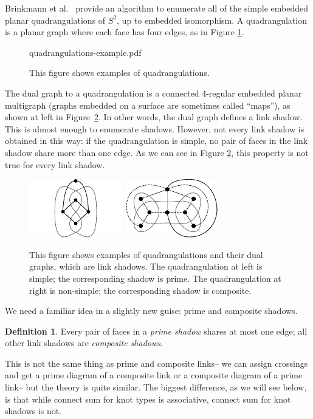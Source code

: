 \documentclass[amsmath,secnumarabic,amssymb,floatfix,nofootinbib,nobibnotes,letterpaper,11pt,tightenlines,showkeys]{revtex4}
\theoremstyle{definition}
\newtheorem{definition}[theorem]{Definition}
\let\mgp=\marginpar \marginparwidth18mm \marginparsep1mm
\def\marginpar#1{\mgp{\raggedright\tiny #1}}
\let\lbl=\label
\def\label#1{\lbl{#1}\ifinner\else\marginpar{\ref{#1} #1}\ignorespaces\fi}
\begin{document}
Brinkmann et al.~\cite{Brinkmann:2007up} provide an algorithm to enumerate all of the simple embedded planar quadrangulations of $S^2$, up to embedded isomorphism. A quadrangulation is a planar graph where each face has four edges, as in Figure \ref{fig:QuadExamples}.
\begin{figure}[H]
	\begin{center}
	\begin{overpic}[width=3in]{quadrangulations-example.pdf}
	\end{overpic}
	\end{center}
	\caption{\label{fig:QuadExamples} This figure shows examples of quadrangulations.}
\end{figure}
The dual graph to a quadrangulation is a connected 4-regular embedded planar multigraph (graphs embedded on a surface are sometimes called ``maps''), as shown at left in Figure~\ref{fig:NonSimpleQuad}. In other words, the dual graph defines a link shadow. This is almost enough to enumerate shadows. However, not every link shadow is obtained in this way: if the quadrangulation is simple, no pair of faces in the link shadow share more than one edge. As we can see in Figure \ref{fig:NonSimpleQuad}, this property is not true for every link shadow.
\begin{figure}[H]
\hphantom{.}
\hfill
\includegraphics[height=1in]{quadrangulation.pdf} \hfill
\includegraphics[height=1in]{non-simple-quadrangulation.pdf}
\hfill
\hphantom{.}
\caption{\label{fig:NonSimpleQuad} This figure shows examples of quadrangulations and their dual graphs, which are link shadows. The quadrangulation at left is simple; the corresponding shadow is prime. The quadrangulation at right is non-simple; the corresponding shadow is composite.}
\end{figure}
We need a familiar idea in a slightly new guise: prime and composite shadows.
\begin{definition}
Every pair of faces in a \emph{prime shadow} shares at most one edge; all other link shadows are \emph{composite shadows}.
\end{definition}
This is not the same thing as prime and composite links-- we can assign crossings and get a prime diagram of a composite link or a composite diagram of a prime link-- but the theory is quite similar. The biggest difference, as we will see below, is that while connect sum for knot types is associative, connect sum for knot shadows is not.
\end{document}

